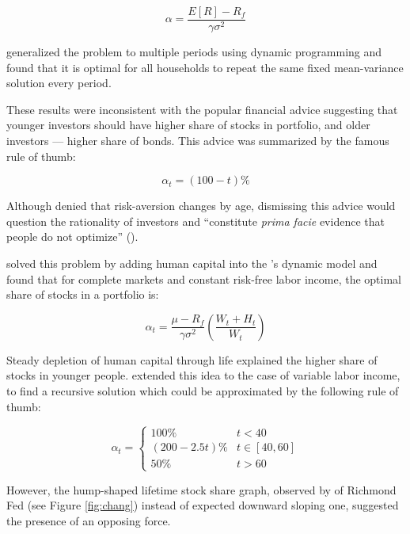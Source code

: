 \documentclass[]{elsarticle}
\begin{document}
\begin{equation}
	\alpha = \frac{E[R] - R_f}{\gamma\sigma^2}
\end{equation}

\citet{merton} generalized the problem to multiple periods using dynamic programming and found that it is optimal for all households to repeat the same fixed mean-variance solution every period.

These results were inconsistent with the popular financial advice suggesting that younger investors should have higher share of stocks in portfolio, and older investors --- higher share of bonds. This advice was summarized by the famous rule of thumb:

\begin{equation}
	\alpha_t = (100 - t)\%
\end{equation}

Although \citet{samuelson} denied that risk-aversion changes by age, dismissing this advice would question the rationality of investors and ``constitute \textit{prima facie} evidence that people do not optimize'' (\citet{canner}).

\citet{bodie} solved this problem by adding human capital into the \citet{merton}'s dynamic model and found that for complete markets and constant risk-free labor income, the optimal share of stocks in a portfolio is:

\begin{equation}
	\alpha_t = \frac{\mu - R_f}{\gamma \sigma^2}(\frac{W_t + H_t}{W_t})
\end{equation}

Steady depletion of human capital through life explained the higher share of stocks in younger people. \citet{cgm} extended this idea to the case of variable labor income, to find a recursive solution which could be approximated by the following rule of thumb:

\begin{equation}
	\alpha_t =
	\begin{cases}
		100\% 			& 	t<40\\
		(200-2.5t)\% 	& 	t\in[40,60]\\
		50\% 			& 	t>60
	\end{cases}
\end{equation}


However, the hump-shaped lifetime stock share graph, observed by \citet{chang} of Richmond Fed (see Figure \ref{fig:chang}) instead of expected downward sloping one, suggested the presence of an opposing force.
\end{document}
